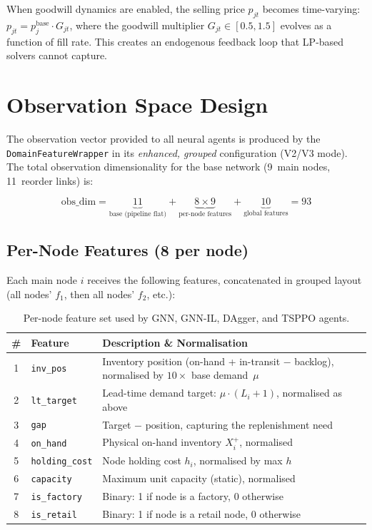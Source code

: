 When goodwill dynamics are enabled, the selling price $p_{jt}$ becomes
time-varying: $p_{jt} = p_j^{\text{base}} \cdot G_{jt}$, where the
goodwill multiplier $G_{jt} \in [0.5, 1.5]$ evolves as a function of
fill rate. This creates an endogenous feedback loop that LP-based
solvers cannot capture.

\section{Observation Space Design}\label{app:obs_space}

The observation vector provided to all neural agents is produced by
the \texttt{DomainFeatureWrapper} in its \emph{enhanced, grouped}
configuration (V2/V3 mode). The total observation dimensionality for the
base network (9~main nodes, 11~reorder links) is:

\[
\text{obs\_dim} = \underbrace{11}_{\text{base (pipeline flat)}}
  + \underbrace{8 \times 9}_{\text{per-node features}}
  + \underbrace{10}_{\text{global features}} = 93
\]

\subsection{Per-Node Features (8 per node)}

Each main node $i$ receives the following features, concatenated in grouped
layout (all nodes' $f_1$, then all nodes' $f_2$, etc.):

\begin{table}[htbp]
\centering
\caption{Per-node feature set used by GNN, GNN-IL, DAgger, and TSPPO agents.}
\label{tab:node_features}
\small
\begin{tabular}{clp{7cm}}
\toprule
\textbf{\#} & \textbf{Feature} & \textbf{Description \& Normalisation} \\
\midrule
1 & \texttt{inv\_pos} & Inventory position (on-hand + in-transit $-$ backlog),
    normalised by $10 \times$ base demand~$\mu$ \\
2 & \texttt{lt\_target} & Lead-time demand target: $\mu \cdot (L_i + 1)$,
    normalised as above \\
3 & \texttt{gap} & Target $-$ position, capturing the replenishment need \\
4 & \texttt{on\_hand} & Physical on-hand inventory $X_i^+$, normalised \\
5 & \texttt{holding\_cost} & Node holding cost $h_i$, normalised by max $h$ \\
6 & \texttt{capacity} & Maximum unit capacity (static), normalised \\
7 & \texttt{is\_factory} & Binary: 1 if node is a factory, 0 otherwise \\
8 & \texttt{is\_retail} & Binary: 1 if node is a retail node, 0 otherwise \\
\bottomrule
\end{tabular}
\end{table}


